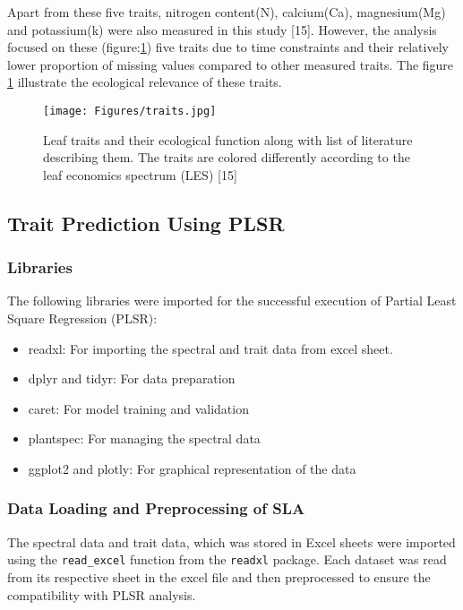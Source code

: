 \documentclass[12pt,a4paper]{report}
\begin{document}
Apart from these five traits, nitrogen content(N), calcium(Ca), magnesium(Mg) and potassium(k) were also measured in this study [15]. However, the analysis focused on these (figure:\ref{fig:traits}) five traits due to time constraints and their relatively lower proportion of missing values compared to other measured traits. The figure \ref{fig:traits} illustrate the ecological relevance of these traits.

\begin{figure}[h]
    \centering
    \texttt{[image: Figures/traits.jpg]}
    \caption{Leaf traits and their ecological function along with list of literature describing them. The traits are colored differently according to the leaf economics spectrum (LES) [15]}
    \label{fig:traits}
\end{figure}

\subsection{Trait Prediction Using PLSR}
\subsubsection*{Libraries}
The following libraries were imported for the successful execution of Partial Least Square Regression (PLSR): \\
\begin{itemize}
    \item readxl: For importing the spectral and trait data from excel sheet.
    \item dplyr and tidyr: For data preparation
    \item caret: For model training and validation
    \item plantspec: For managing the spectral data
    \item ggplot2 and plotly: For graphical representation of the data
\end{itemize}

\subsubsection*{Data Loading and Preprocessing of SLA}
The spectral data and trait data, which was stored in Excel sheets were imported using the \texttt{read\_excel} function from the \texttt{readxl} package. Each dataset was read from its respective sheet in the excel file and then preprocessed to ensure the compatibility with PLSR analysis. \\
\end{document}
